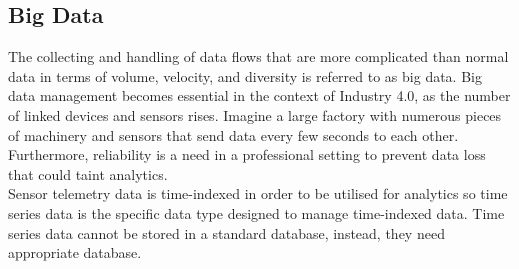 \subsection{Big Data}
The collecting and handling of data flows that are more complicated than normal data in terms of volume, velocity, and diversity is referred to as big data. Big data management becomes essential in the context of Industry 4.0, as the number of linked devices and sensors rises. Imagine a large factory with numerous pieces of machinery and sensors that send data every few seconds to each other. Furthermore, reliability is a need in a professional setting to prevent data loss that could taint analytics.\\
Sensor telemetry data is time-indexed in order to be utilised for analytics so time series data is the specific data type designed to manage time-indexed data. Time series data cannot be stored in a standard database, instead, they need appropriate database.
